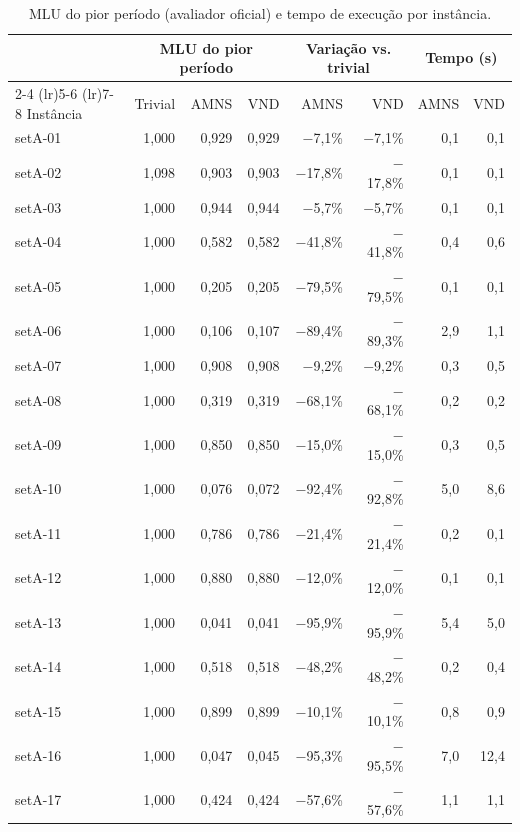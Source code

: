 \begin{table}[H]
\centering
\caption{MLU do pior período (avaliador oficial) e tempo de execução por instância.}
\label{tab:resultados}
\footnotesize
\begin{tabular}{lrrrrrrr}
\toprule
 & \multicolumn{3}{c}{MLU do pior período} & \multicolumn{2}{c}{Variação vs. trivial} & \multicolumn{2}{c}{Tempo (s)} \\
\cmidrule(lr){2-4} \cmidrule(lr){5-6} \cmidrule(lr){7-8}
Instância & Trivial & AMNS & VND & AMNS & VND & AMNS & VND \\
\midrule
setA-01 & 1{,}000 & 0{,}929 & 0{,}929 & $-$7{,}1\% & $-$7{,}1\% & 0{,}1 & 0{,}1 \\
setA-02 & 1{,}098 & 0{,}903 & 0{,}903 & $-$17{,}8\% & $-$17{,}8\% & 0{,}1 & 0{,}1 \\
setA-03 & 1{,}000 & 0{,}944 & 0{,}944 & $-$5{,}7\% & $-$5{,}7\% & 0{,}1 & 0{,}1 \\
setA-04 & 1{,}000 & 0{,}582 & 0{,}582 & $-$41{,}8\% & $-$41{,}8\% & 0{,}4 & 0{,}6 \\
setA-05 & 1{,}000 & 0{,}205 & 0{,}205 & $-$79{,}5\% & $-$79{,}5\% & 0{,}1 & 0{,}1 \\
setA-06 & 1{,}000 & 0{,}106 & 0{,}107 & $-$89{,}4\% & $-$89{,}3\% & 2{,}9 & 1{,}1 \\
setA-07 & 1{,}000 & 0{,}908 & 0{,}908 & $-$9{,}2\% & $-$9{,}2\% & 0{,}3 & 0{,}5 \\
setA-08 & 1{,}000 & 0{,}319 & 0{,}319 & $-$68{,}1\% & $-$68{,}1\% & 0{,}2 & 0{,}2 \\
setA-09 & 1{,}000 & 0{,}850 & 0{,}850 & $-$15{,}0\% & $-$15{,}0\% & 0{,}3 & 0{,}5 \\
setA-10 & 1{,}000 & 0{,}076 & 0{,}072 & $-$92{,}4\% & $-$92{,}8\% & 5{,}0 & 8{,}6 \\
setA-11 & 1{,}000 & 0{,}786 & 0{,}786 & $-$21{,}4\% & $-$21{,}4\% & 0{,}2 & 0{,}1 \\
setA-12 & 1{,}000 & 0{,}880 & 0{,}880 & $-$12{,}0\% & $-$12{,}0\% & 0{,}1 & 0{,}1 \\
setA-13 & 1{,}000 & 0{,}041 & 0{,}041 & $-$95{,}9\% & $-$95{,}9\% & 5{,}4 & 5{,}0 \\
setA-14 & 1{,}000 & 0{,}518 & 0{,}518 & $-$48{,}2\% & $-$48{,}2\% & 0{,}2 & 0{,}4 \\
setA-15 & 1{,}000 & 0{,}899 & 0{,}899 & $-$10{,}1\% & $-$10{,}1\% & 0{,}8 & 0{,}9 \\
setA-16 & 1{,}000 & 0{,}047 & 0{,}045 & $-$95{,}3\% & $-$95{,}5\% & 7{,}0 & 12{,}4 \\
setA-17 & 1{,}000 & 0{,}424 & 0{,}424 & $-$57{,}6\% & $-$57{,}6\% & 1{,}1 & 1{,}1 \\

\end{tabular}
\end{table}
